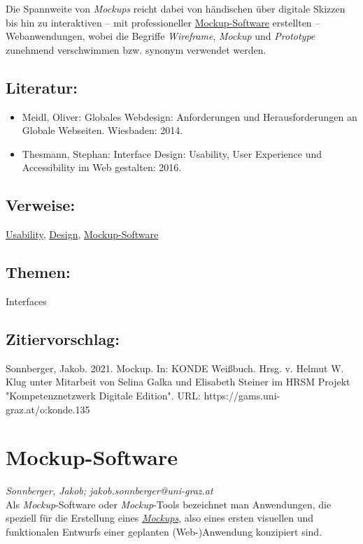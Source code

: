 \documentclass{article}
\begin{document}
        Die Spannweite von \emph{Mockups} reicht dabei von händischen über
                  digitale Skizzen bis hin zu interaktiven – mit professioneller \href{http://gams.uni-graz.at/o:konde.136}{Mockup-Software} erstellten – Webanwendungen, wobei die Begriffe \emph{Wireframe}, \emph{Mockup} und 
                     \emph{Prototype}
                   zunehmend verschwimmen
                  bzw. synonym verwendet werden. \\
            
        \subsection*{Literatur:}\begin{itemize}\item Meidl, Oliver: Globales Webdesign: Anforderungen und Herausforderungen
                              an Globale Webseiten. Wiesbaden: 2014.\item Thesmann, Stephan: Interface Design: Usability, User Experience und
                              Accessibility im Web gestalten: 2016.\end{itemize}\subsection*{Verweise:}\href{https://gams.uni-graz.at/o:konde.205}{Usability}, \href{https://gams.uni-graz.at/o:konde.56}{Design}, \href{https://gams.uni-graz.at/o:konde.136}{Mockup-Software}\subsection*{Themen:}Interfaces\subsection*{Zitiervorschlag:}Sonnberger, Jakob. 2021. Mockup. In: KONDE Weißbuch. Hrsg. v. Helmut W. Klug unter Mitarbeit von Selina Galka und Elisabeth Steiner im HRSM Projekt "Kompetenznetzwerk Digitale Edition". URL: https://gams.uni-graz.at/o:konde.135\newpage\section*{Mockup-Software} \emph{Sonnberger, Jakob; jakob.sonnberger@uni-graz.at }\\
        
    Als \emph{Mockup}-Software oder \emph{Mockup}-Tools bezeichnet man Anwendungen, die speziell für die Erstellung eines \emph{\href{http://gams.uni-graz.at/o:konde.135}{Mockups}}, also eines ersten visuellen und funktionalen Entwurfs einer geplanten (Web-)Anwendung konzipiert sind. \\
            
\end{document}
